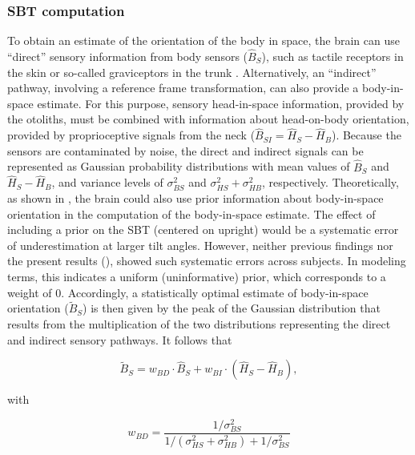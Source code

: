 \subsubsection{SBT computation}
\label{p1:sec:sbt_computation}
 
To obtain an estimate of the orientation of the body in space, the brain can use ``direct'' sensory information from body sensors ($\hat{B}_S$), such as tactile receptors in the skin or so-called graviceptors in the trunk \cite{mittelstaedt1997, mittelstaedt1998, vaitl2002}. Alternatively, an ``indirect'' pathway, involving a reference frame transformation, can also provide a body-in-space estimate. For this purpose, sensory head-in-space information, provided by the otoliths, must be combined with information about head-on-body orientation, provided by proprioceptive signals from the neck ($\hat{B}_{SI} = \hat{H}_S - \hat{H}_B$). Because the sensors are contaminated by noise, the direct and indirect signals can be represented as Gaussian probability distributions with mean values of $\hat{B}_S$ and $\hat{H}_S - \hat{H}_B$, and variance levels of $\sigma_{BS}^2$ and $\sigma_{HS}^2 + \sigma_{HB}^2$, respectively. Theoretically, as shown in , the brain could also use prior information about body-in-space orientation in the computation of the body-in-space estimate. The effect of including a prior on the SBT (centered on upright) would be a systematic error of underestimation at larger tilt angles. However, neither previous findings \cite{mittelstaedt1983, mast1996, jarchow1999, vanbeuzekom2001} nor the present results (), showed such systematic errors across subjects. In modeling terms, this indicates a uniform (uninformative) prior, which corresponds to a weight of 0. Accordingly, a statistically optimal estimate of body-in-space orientation ($\tilde{B}_S$) is then given by the peak of the Gaussian distribution that results from the multiplication of the two distributions representing the direct and indirect sensory pathways. It follows that

\begin{equation}
\label{p1:eqn2}
\tilde{B}_S = w_{BD} \cdot \hat{B}_S + w_{BI} \cdot (\hat{H}_S - \hat{H}_B),
\end{equation}

with

\begin{equation}
\label{p1:eqn3}
w_{BD} = \frac{1/\sigma^2_{BS}}{1/(\sigma^2_{HS} + \sigma^2_{HB}) + 1/\sigma^2_{BS}}
\end{equation}

